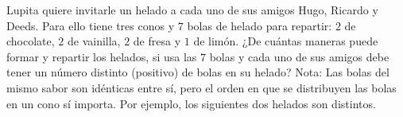 Lupita quiere invitarle un helado a cada uno de sus amigos Hugo, Ricardo y Deeds. Para ello tiene tres conos y $7$ bolas de helado para repartir: $2$ de chocolate, $2$ de vainilla, $2$ de fresa y $1$ de limón. ¿De cuántas maneras puede formar y repartir los helados, si usa las $7$ bolas y cada uno de sus amigos debe tener un número distinto (positivo) de bolas en su helado? Nota: Las bolas del mismo sabor son idénticas entre sí, pero el orden en que se distribuyen las bolas en un cono sí importa. Por ejemplo, los siguientes dos helados son distintos.